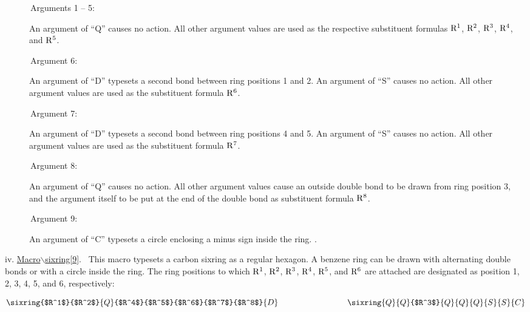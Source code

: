  \begin{description}
 \item[{\rm \ \ \ \ \ \ Arguments 1 -- 5:}] An argument of ``Q''
      causes no action. All other argument values are used as the
      respective substituent formulas ${\rm R^1}$, ${\rm R^2}$,
      ${\rm R^3}$, ${\rm R^4}$, and ${\rm R^5}$.
 \item[{\rm \ \ \ \ \ \ Argument 6:}] An argument of ``D'' typesets
      a second bond between ring positions 1 and 2. An argument
      of ``S'' causes no action. All other argument values are
      used as the substituent formula ${\rm R^6}$.
 \item[{\rm \ \ \ \ \ \ Argument 7:}] An argument of ``D'' typesets
      a second bond between ring positions 4 and 5. An argument
      of ``S'' causes no action.  All other argument values are
      used as the substituent formula ${\rm R^7}$.
 \item[{\rm \ \ \ \ \ \ Argument 8:}] An argument of ``Q'' causes
      no action. All other argument values cause an outside
      double bond to be drawn from ring position 3, and the
      argument itself to be put at the end of the double bond
      as substituent formula ${\rm R^8}$.
 \item[{\rm \ \ \ \ \ \ Argument 9:}] An argument of ``C'' typesets
      a circle enclosing a minus sign inside the ring. \ri .
 \end{description}

 \vspace{\len mm}
 \indent iv. \underline{Macro$\backslash $sixring[9]}.
 \ This macro typesets a carbon sixring as a regular hexagon. 
 A benzene ring can be drawn with alternating double bonds or
 with a circle inside the ring. The ring positions to which
 ${\rm R^1}$, ${\rm R^2}$, ${\rm R^3}$, ${\rm R^4}$, ${\rm R^5}$,
 and ${\rm R^6}$ are attached are designated as position
 1, 2, 3, 4, 5, and 6, respectively:

 \[ \sixring{$R^1$}{$R^2$}{Q}{$R^4$}{$R^5$}{$R^6$}{$R^7$}{$R^8$}{D}
    \hspace{3cm}
    \sixring{Q}{Q}{$R^3$}{Q}{Q}{Q}{S}{S}{C}  \]

